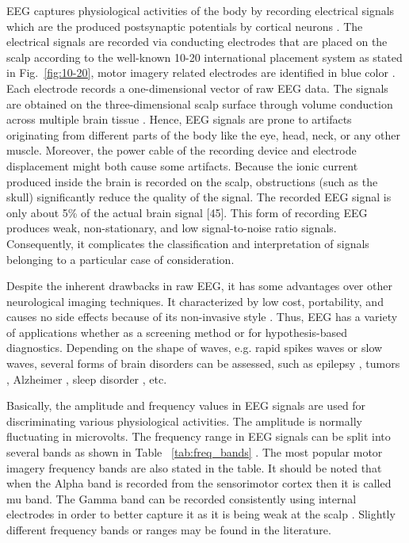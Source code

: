 \documentclass[journal,twocolumn]{IEEEtran}
\begin{document}
EEG captures physiological activities of the body by recording electrical signals which are the produced postsynaptic potentials by cortical neurons \cite{sazgar2019overview}. The electrical signals are recorded via conducting electrodes that are placed on the scalp according to the well-known 10-20 international placement system as stated in Fig.~\ref{fig:10-20}, motor imagery related electrodes are identified in blue color \cite{Kwon2020}. Each electrode records a one-dimensional vector of raw EEG data. The signals are obtained on the three-dimensional scalp surface through volume conduction across multiple brain tissue \cite{sazgar2019overview}. Hence, EEG signals are prone to artifacts originating from different parts of the body like the eye, head, neck, or any other muscle. Moreover, the power cable of the recording device and electrode displacement might both cause some artifacts. Because the ionic current produced inside the brain is recorded on the scalp, obstructions (such as the skull) significantly reduce the quality of the signal. The recorded EEG signal is only about 5\% of the actual brain signal [45]. This form of recording EEG produces weak, non-stationary, and low signal-to-noise ratio signals. Consequently, it complicates the classification and interpretation of signals belonging to a particular case of consideration.

Despite the inherent drawbacks in raw EEG, it has some advantages over other neurological imaging techniques. It characterized by low cost, portability, and causes no side effects because of its non-invasive style \cite{qiao2019deep}. Thus, EEG has a variety of applications whether as a screening method or for hypothesis-based diagnostics. Depending on the shape of waves, e.g. rapid spikes waves or slow waves, several forms of brain disorders can be assessed, such as epilepsy \cite{mardini2020enhanced}, tumors \cite{mardini2020enhanced}, Alzheimer \cite{pandya2020buildout}, sleep disorder \cite{geng2020novel}, etc.

Basically, the amplitude and frequency values in EEG signals are used for discriminating various physiological activities. The amplitude is normally fluctuating in microvolts. The frequency range in EEG signals can be split into several bands as shown in Table ~\ref{tab:freq_bands} \cite{wang2018lstm}. The most popular motor imagery frequency bands are also stated in the table. It should be noted that when the Alpha band is recorded from the sensorimotor cortex then it is called mu band. The Gamma band can be recorded consistently using internal electrodes in order to better capture it as it is being weak at the scalp \cite{padfield2019eeg}. Slightly different frequency bands or ranges may be found in the literature.
\end{document}
